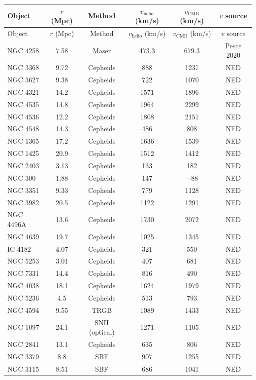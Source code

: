 \documentclass[11pt]{article}
\begin{document}
{\small
\begin{longtable}{lccccc}
\toprule
Object & $r$ (Mpc) & Method & $v_{\text{helio}}$ (km/s) & $v_{\text{CMB}}$ (km/s) & $v$ source \\
\midrule
\endfirsthead
\toprule
Object & $r$ (Mpc) & Method & $v_{\text{helio}}$ (km/s) & $v_{\text{CMB}}$ (km/s) & $v$ source \\
\midrule
\endhead
\bottomrule
\endfoot
\bottomrule
\endlastfoot
NGC 4258 & 7.58 & Maser & 473.3 & 679.3 & Pesce 2020 \\
NGC 3368 & 9.72 & Cepheids & 888 & 1237 & NED \\
NGC 3627 & 9.38 & Cepheids & 722 & 1070 & NED \\
NGC 4321 & 14.2 & Cepheids & 1571 & 1896 & NED \\
NGC 4535 & 14.8 & Cepheids & 1964 & 2299 & NED \\
NGC 4536 & 12.2 & Cepheids & 1808 & 2151 & NED \\
NGC 4548 & 14.3 & Cepheids & 486 & 808 & NED \\
NGC 1365 & 17.2 & Cepheids & 1636 & 1539 & NED \\
NGC 1425 & 20.9 & Cepheids & 1512 & 1412 & NED \\
NGC 2403 & 3.13 & Cepheids & 133 & 182 & NED \\
NGC 300 & 1.88 & Cepheids & 147 & $-$88 & NED \\
NGC 3351 & 9.33 & Cepheids & 779 & 1128 & NED \\
NGC 3982 & 20.5 & Cepheids & 1122 & 1291 & NED \\
NGC 4496A & 13.6 & Cepheids & 1730 & 2072 & NED \\
NGC 4639 & 19.7 & Cepheids & 1025 & 1345 & NED \\
IC 4182 & 4.07 & Cepheids & 321 & 550 & NED \\
NGC 5253 & 3.01 & Cepheids & 407 & 681 & NED \\
NGC 7331 & 14.4 & Cepheids & 816 & 490 & NED \\
NGC 4038 & 18.1 & Cepheids & 1624 & 1979 & NED \\
NGC 5236 & 4.5 & Cepheids & 513 & 793 & NED \\
NGC 4594 & 9.55 & TRGB & 1089 & 1433 & NED \\
NGC 1097 & 24.1 & SNII (optical) & 1271 & 1105 & NED \\
NGC 2841 & 13.1 & Cepheids & 635 & 806 & NED \\
NGC 3379 & 8.8 & SBF & 907 & 1255 & NED \\
NGC 3115 & 8.51 & SBF & 686 & 1041 & NED \\

\end{longtable}}
\end{document}

